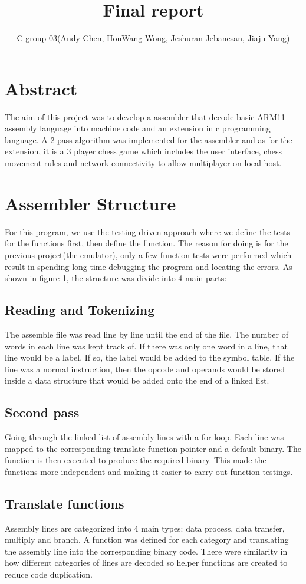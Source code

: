 \documentclass{article}
\title{Final report}
\author{C group 03(Andy Chen, HouWang Wong, Jeshuran Jebanesan, Jiaju Yang)}
\begin{document}
\maketitle

\section{Abstract}
The aim of this project was to develop a  assembler that decode basic ARM11 assembly language into machine code and an extension  in c programming language. A 2 pass algorithm was implemented for the assembler and as for the extension, it is a 3 player chess game which includes the user interface, chess movement rules and network connectivity to allow multiplayer on local host.
\section{Assembler Structure}
For this program, we use the testing driven approach where we define the tests for the functions first, then define the function. The reason for doing is for the previous project(the emulator), only a few function tests were performed which result in spending long time debugging the program and locating the errors.\newline\newline
As shown in figure 1, the structure was divide into 4 main parts: 
\subsection{Reading and Tokenizing}
    The assemble file was read line by line until the end of the file. The number of words in each line was kept track of. If there was only one word in a line, that line would be a label. If so, the label would be added to the symbol table. If the line was a normal instruction, then the opcode and operands would be stored inside a data structure that would be added onto the end of a linked list.
\subsection{Second pass}
    Going through the linked list of assembly lines with a for loop. Each line was mapped to the corresponding translate function pointer and a default binary. The function is then executed to produce the required binary. This made the functions more independent and making it easier to carry out function testings.
    
\subsection{Translate functions}
    Assembly lines are categorized into 4 main types: data process, data transfer, multiply and branch. A function was defined for each category and translating the assembly line into the corresponding binary code. There were similarity in how different categories of lines are decoded so helper functions are created to reduce code duplication.
\end{document}
